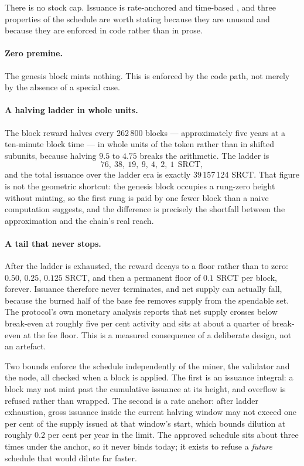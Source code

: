 \documentclass{article}
\begin{document}
There is no stock cap. Issuance is rate-anchored and time-based
\cite{srct-monetary}, and three properties of the schedule are worth stating
because they are unusual and because they are enforced in code rather than in
prose.

\paragraph{Zero premine.} The genesis block mints nothing. This is enforced by
the code path, not merely by the absence of a special case.

\paragraph{A halving ladder in whole units.} The block reward halves every
262\,800 blocks --- approximately five years at a ten-minute block time --- in
whole units of the token rather than in shifted subunits, because halving
$9.5$ to $4.75$ breaks the arithmetic. The ladder is
\begin{equation}
76,\ 38,\ 19,\ 9,\ 4,\ 2,\ 1 \ \ \mathrm{SRCT},
\label{eq:ladder}
\end{equation}
and the total issuance over the ladder era is exactly 39\,157\,124 SRCT. That
figure is not the geometric shortcut: the genesis block occupies a rung-zero
height without minting, so the first rung is paid by one fewer block than a
naive computation suggests, and the difference is precisely the shortfall
between the approximation and the chain's real reach.

\paragraph{A tail that never stops.} After the ladder is exhausted, the reward
decays to a floor rather than to zero: $0.50$, $0.25$, $0.125$ SRCT, and then
a permanent floor of $0.1$ SRCT per block, forever. Issuance therefore never
terminates, and net supply can actually fall, because the burned half of the
base fee removes supply from the spendable set. The protocol's own monetary
analysis reports that net supply crosses below break-even at roughly five per
cent activity and sits at about a quarter of break-even at the fee floor. This
is a measured consequence of a deliberate design, not an artefact.

Two bounds enforce the schedule independently of the miner, the validator and
the node, all checked when a block is applied. The first is an issuance
integral: a block may not mint past the cumulative issuance at its height, and
overflow is refused rather than wrapped. The second is a rate anchor: after
ladder exhaustion, gross issuance inside the current halving window may not
exceed one per cent of the supply issued at that window's start, which bounds
dilution at roughly 0.2 per cent per year in the limit. The approved schedule
sits about three times under the anchor, so it never binds today; it exists to
refuse a \emph{future} schedule that would dilute far faster.
\end{document}
